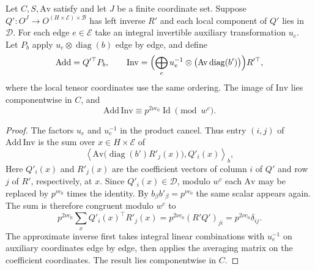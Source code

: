 \begin{lemma}
\label{lem:a-edge-pairing-near-inverse}
\emitthmsource
Let $C,S,\mathrm{Av}$ satisfy  and let $J$ be a finite coordinate set. Suppose $Q':O^J\to O^{(H\times\mathcal E)\times\mathcal B}$ has left inverse $R'$ and each local component of $Q'$ lies in $\mathcal D$. For each edge $e\in\mathcal E$ take an integral invertible auxiliary transformation $u_e$. Let $P_b$ apply $u_e\otimes\operatorname{diag}(b)$ edge by edge, and define
\[
 \mathrm{Add}=Q'^\top P_b,\qquad
 \mathrm{Inv}=\Bigl(\bigoplus_e
          u_e^{-1}\otimes\bigl(\mathrm{Av}\operatorname{diag}(b')\bigr)\Bigr)R'^\top ,
\]
where the local tensor coordinates use the same ordering. The image of $\mathrm{Inv}$ lies componentwise in $C$, and
\[
 \mathrm{Add}\,\mathrm{Inv}\equiv p^{2\nu c_0}\operatorname{Id}
         \pmod{w^c}.
\]
\end{lemma}
\begin{proof}
The factors $u_e$ and $u_e^{-1}$ in the product cancel. Thus entry $(i,j)$ of $\mathrm{Add}\,\mathrm{Inv}$ is the sum over $x\in H\times\mathcal E$ of
\[
 \left\langle\mathrm{Av}\bigl(\operatorname{diag}(b')R'_j(x)\bigr),
                      Q'_i(x)\right\rangle_b ,
\]
Here $Q'_i(x)$ and $R'_j(x)$ are the coefficient vectors of column $i$ of $Q'$ and row $j$ of $R'$, respectively, at $x$. Since $Q'_i(x)\in\mathcal D$, modulo $w^c$ each $\mathrm{Av}$ may be replaced by $p^{\nu c_0}$ times the identity. By $b_\beta b'_\beta=p^{\nu c_0}$ the same scalar appears again. The sum is therefore congruent modulo $w^c$ to
\[
 p^{2\nu c_0}\sum_x Q'_i(x)^\top R'_j(x)
    =p^{2\nu c_0}(R'Q')_{ji}
    =p^{2\nu c_0}\delta_{ij}.
\]
The approximate inverse first takes integral linear combinations with $u_e^{-1}$ on auxiliary coordinates edge by edge, then applies the averaging matrix on the coefficient coordinates. The result lies componentwise in $C$.
\end{proof}

